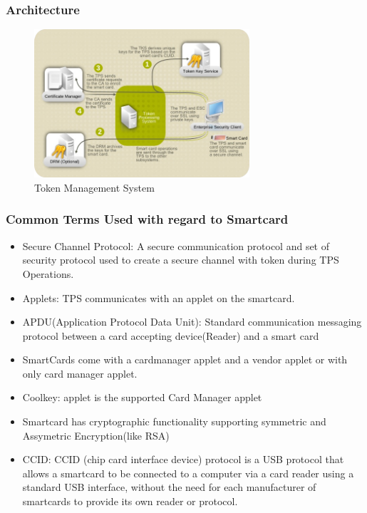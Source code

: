 \documentclass[a4paper]{article}
\begin{document}
\subsubsection{Architecture}
\begin{figure}[H]
    \centering
    \includegraphics[width=80mm]{TMS-workflow.png}
    \caption{Token Management System}
\end{figure}
\subsubsection{Common Terms Used with regard to Smartcard}
    \begin{itemize}
        \item Secure Channel Protocol: A secure communication protocol and set of security protocol used to 
            create a secure channel with token during TPS Operations.
        \item Applets: TPS communicates with an applet on the smartcard. 
        \item APDU(Application Protocol Data Unit): Standard communication messaging protocol between a card accepting device(Reader)
            and a smart card 
        \item SmartCards come with a cardmanager applet and a vendor applet or with only card manager applet. 
        \item Coolkey: applet is the supported Card Manager applet
        \item Smartcard has cryptographic functionality supporting symmetric and Assymetric Encryption(like RSA)
        \item CCID: CCID (chip card interface device) protocol is a USB protocol that allows a smartcard to be 
            connected to a computer via a card reader using a standard USB interface, without the need for 
            each manufacturer of smartcards to provide its own reader or protocol.~\cite{wiki:ccid}
    \end{itemize}
\end{document}
